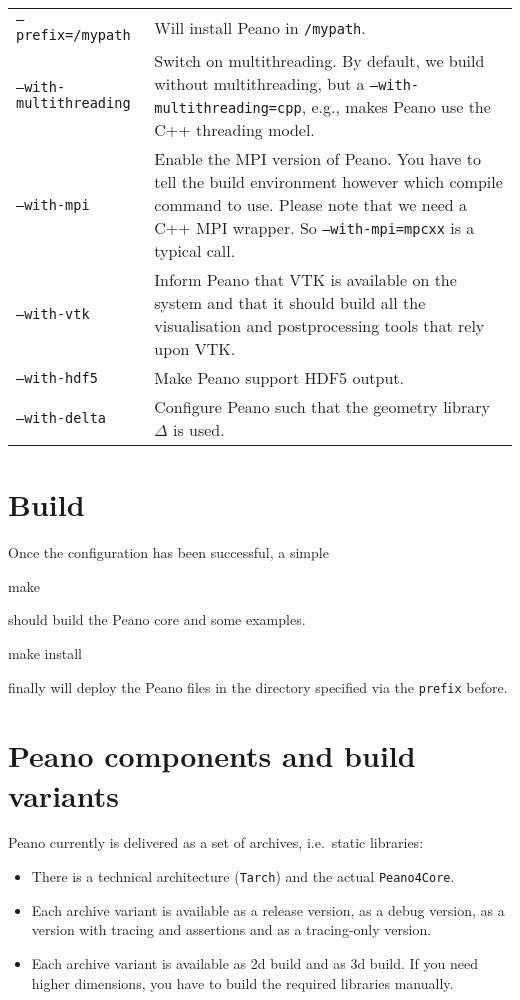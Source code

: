 \begin{center}
 \begin{tabular}{lp{10cm}}
  \texttt{--prefix=/mypath} & Will install Peano in \texttt{/mypath}.
   \\
  \texttt{--with-multithreading} & Switch on multithreading. By default, we
  build without multithreading, but a \texttt{--with-multithreading=cpp}, e.g.,
  makes Peano use the C++ threading model. 
   \\
  \texttt{--with-mpi} & Enable the MPI version of Peano. You have to tell the
  build environment however which compile command to use. Please note that
  we need a C++ MPI wrapper. So \texttt{--with-mpi=mpcxx} is a typical call. 
   \\
  \texttt{--with-vtk} & Inform Peano that VTK is available on the system and
  that it should build all the visualisation and postprocessing tools that rely
  upon VTK.
   \\
  \texttt{--with-hdf5} & Make Peano support HDF5 output. 
   \\
  \texttt{--with-delta} & Configure Peano such that the geometry library
  $\Delta $ is used.
 \end{tabular}
\end{center}


\section{Build}

Once the configuration has been successful, a simple 
\begin{code}
make
\end{code}
should build the Peano core and some examples.


\begin{code}
make install
\end{code}
finally will deploy the Peano files in the directory specified via the
\texttt{prefix} before.


\section{Peano components and build variants}

Peano currently is delivered as a set of archives, i.e.~static libraries:
\begin{itemize}
  \item There is a technical architecture (\texttt{Tarch}) and the actual
  \texttt{Peano4Core}.
  \item Each archive variant is available as a release version, as a debug
  version, as a version with tracing and assertions and as a tracing-only
  version.
  \item Each archive variant is available as 2d build and as 3d build. If you
  need higher dimensions, you have to build the required libraries manually.
\end{itemize}


